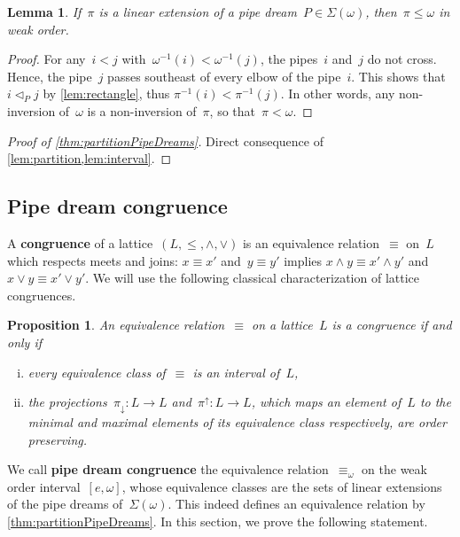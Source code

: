 \documentclass{amsart}
\newtheorem{proposition}[theorem]{Proposition}
\newtheorem{lemma}[theorem]{Lemma}
\theoremstyle{definition}
\newcommand{\defn}[1]{\textbf{\textsf{\color{PineGreen} #1}}} %
\newcommand{\acyclicPipeDreams}{\Sigma} %
\newcommand{\meet}{\wedge} %
\newcommand{\join}{\vee} %
\newcommand{\less}{\vartriangleleft} %
\newcommand{\contactLess}[1]{\less_{#1}} %
\newcommand{\projDown}{\pi_\downarrow} %
\newcommand{\projUp}{\pi^\uparrow} %
\begin{document}
\begin{lemma}
\label{lem:interval}
If~$\pi$ is a linear extension of a pipe dream~$P \in \acyclicPipeDreams(\omega)$, then~$\pi \le \omega$ in weak order.
\end{lemma}

\begin{proof}
For any~$i < j$ with~$\omega^{-1}(i) < \omega^{-1}(j)$, the pipes~$i$ and~$j$ do not cross.
Hence, the pipe~$j$ passes southeast of every elbow of the pipe~$i$.
This shows that~$i \contactLess{P} j$ by \cref{lem:rectangle}, thus ${\pi^{-1}(i) < \pi^{-1}(j)}$.
In other words, any non-inversion of~$\omega$ is a non-inversion of~$\pi$, so that~${\pi < \omega}$.
\end{proof}

\begin{proof}[Proof of \cref{thm:partitionPipeDreams}]
Direct consequence of \cref{lem:partition,lem:interval}.
\end{proof}


\subsection{Pipe dream congruence}
\label{subsec:pipeDreamCongruence}

A \defn{congruence} of a lattice~$(L, \le, \meet, \join)$ is an equivalence relation~$\equiv$ on~$L$ which respects meets and joins: $x \equiv x'$ and~$y \equiv y'$ implies $x \meet y \equiv x' \meet y'$ and~$x \join y \equiv x' \join y'$.
We will use the following classical characterization of lattice congruences.

\begin{proposition}
\label{prop:characterizationCongruences}
An equivalence relation~$\equiv$ on a lattice~$L$ is a congruence if and only if
\begin{enumerate}[(i)]
\item every equivalence class of~$\equiv$ is an interval of~$L$,
\item the projections~$\projDown : L \to L$ and~$\projUp : L \to L$, which maps an element of~$L$ to the minimal and maximal elements of its equivalence class respectively, are order preserving.
\end{enumerate}
\end{proposition}

We call \defn{pipe dream congruence} the equivalence relation~$\equiv_\omega$ on the weak order interval~$[e,\omega]$, whose equivalence classes are the sets of linear extensions of the pipe dreams of~$\acyclicPipeDreams(\omega)$.
This indeed defines an equivalence relation by \cref{thm:partitionPipeDreams}.
In this section, we prove the following statement.
\end{document}
